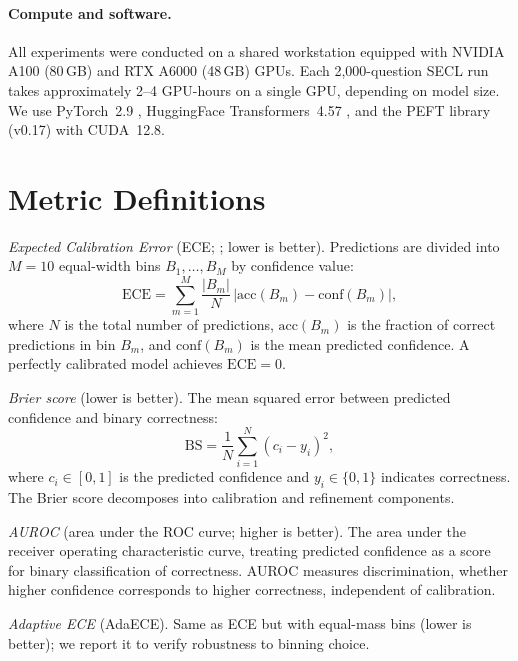 \paragraph{Compute and software.}
All experiments were conducted on a shared workstation equipped with NVIDIA A100 (80\,GB) and RTX A6000 (48\,GB) GPUs.
Each 2{,}000-question SECL run takes approximately 2--4 GPU-hours on a single GPU, depending on model size.
We use PyTorch~2.9 \citep{paszke_pytorch_2019}, HuggingFace Transformers~4.57 \citep{wolf_transformers_2020}, and the PEFT library (v0.17) with CUDA~12.8.

\section{Metric Definitions} \label{app:metrics}

\emph{Expected Calibration Error} (ECE; \citealt{naeini_obtaining_2015, guo_calibration_2017}; lower is better). Predictions are divided into $M{=}10$ equal-width bins $B_1, \dots, B_M$ by confidence value:
\begin{equation}
    \text{ECE} = \sum_{m=1}^{M} \frac{|B_m|}{N} 
    \,\big|\text{acc}(B_m) - \text{conf}(B_m)\big|,
\end{equation}
where $N$ is the total number of predictions, $\text{acc}(B_m)$ is the fraction of correct predictions in bin $B_m$, and $\text{conf}(B_m)$ is the mean predicted confidence. A perfectly calibrated model achieves $\text{ECE} = 0$.

\emph{Brier score} \cite{brier_verification_1950} (lower is better). The mean squared error between predicted confidence and binary correctness:
\begin{equation}
    \text{BS} = \frac{1}{N} \sum_{i=1}^{N} 
    (c_i - y_i)^2,
\end{equation}
where $c_i \in [0,1]$ is the predicted confidence and $y_i \in \{0,1\}$ indicates correctness. The Brier score decomposes into calibration and refinement components.

\emph{AUROC} (area under the ROC curve; higher is better). The area under the receiver operating characteristic curve, treating predicted confidence as a score for binary classification of correctness. AUROC measures discrimination, whether higher confidence corresponds to higher correctness, independent of calibration.

\emph{Adaptive ECE} (AdaECE). Same as ECE but with equal-mass bins (lower is better); we report it to verify robustness to binning choice.

